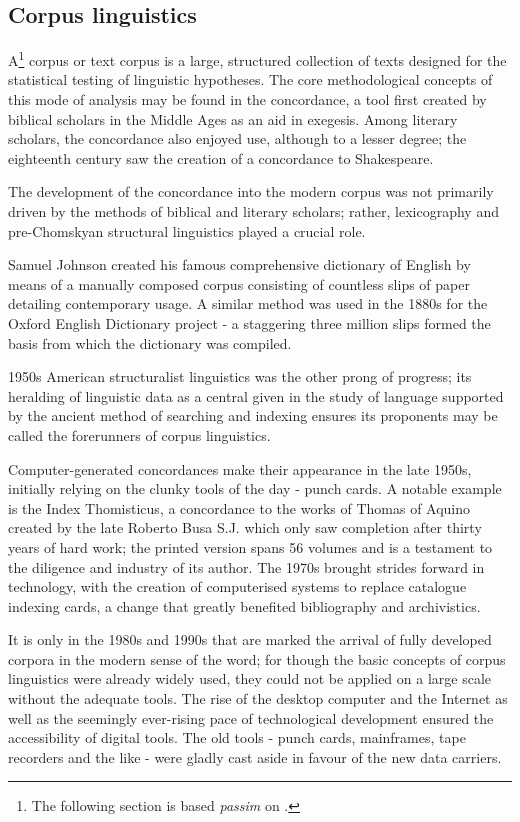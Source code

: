 \subsection{Corpus linguistics}
A\footnote{The following section is based \emph{passim} on
\citet{okeeffe2010}.} corpus or text corpus is a large, structured
collection of texts designed for the statistical testing of linguistic
hypotheses. The core methodological concepts of this mode of analysis
may be found in the concordance, a tool first created by biblical
scholars in the Middle Ages as an aid in exegesis. Among literary
scholars, the concordance also enjoyed use, although to a lesser
degree; the eighteenth century saw the creation of a concordance to
Shakespeare.

The development of the concordance into the modern corpus was not
primarily driven by the methods of biblical and literary scholars;
rather, lexicography and pre-Chomskyan structural linguistics played a
crucial role.

Samuel Johnson created his famous comprehensive dictionary of English
by means of a manually composed corpus consisting of countless slips
of paper detailing contemporary usage. A similar method was used in
the 1880s for the Oxford English Dictionary project - a staggering
three million slips formed the basis from which the dictionary was
compiled.

1950s American structuralist linguistics was the other prong of
progress; its heralding of linguistic data as a central given in the
study of language supported by the ancient method of searching and
indexing ensures its proponents may be called the forerunners of
corpus linguistics.

Computer-generated concordances make their appearance in the late
1950s, initially relying on the clunky tools of the day - punch
cards. A notable example is the Index Thomisticus, a
concordance to the works of Thomas of Aquino created by the late
Roberto Busa S.J. which only saw completion after thirty years of hard
work; the printed version spans 56 volumes and is a testament to the
diligence and industry of its author. The 1970s brought strides
forward in technology, with the creation of computerised systems to
replace catalogue indexing cards, a change that greatly benefited
bibliography and archivistics.

It is only in the 1980s and 1990s that are marked the arrival of fully
developed corpora in the modern sense of the word; for though the
basic concepts of corpus linguistics were already widely used, they
could not be applied on a large scale without the adequate tools. The
rise of the desktop computer and the Internet as well as the seemingly
ever-rising pace of technological development ensured the
accessibility of digital tools.  The old tools - punch cards,
mainframes, tape recorders and the like - were gladly cast aside in
favour of the new data carriers.

